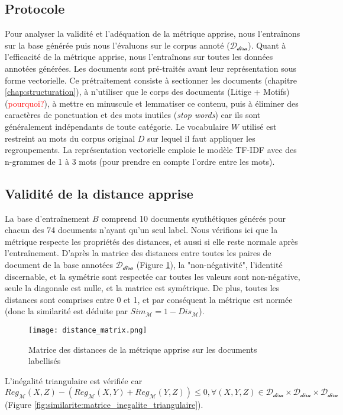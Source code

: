 \subsection{Protocole}
Pour analyser la validité et l'adéquation de la métrique apprise, nous l'entraînons sur la base générée puis nous l'évaluons sur le corpus annoté ($\mathcal{D_{\text{dira}}}$). Quant à l'efficacité de la métrique apprise, nous l'entraînons sur toutes les données annotées générées. Les documents sont pré-traités avant leur représentation sous forme vectorielle. Ce prétraitement consiste à sectionner les documents (chapitre \ref{chap:structuration}), à n'utiliser que le corps des documents (Litige + Motifs) (\textcolor{red}{pourquoi?}), à mettre en minuscule et lemmatiser ce contenu, puis à éliminer des caractères de ponctuation et des mots inutiles (\textit{stop words})  car ils sont généralement indépendants de toute catégorie. Le vocabulaire $W$ utilisé est restreint au mots du corpus original $D$ sur lequel il faut appliquer les regroupements. La représentation vectorielle emploie le modèle TF-IDF avec des n-grammes de 1 à 3 mots (pour prendre en compte l'ordre entre les mots).

\subsection{Validité de la distance apprise}
La base d'entraînement $B$ comprend 10 documents synthétiques générés pour chacun des 74 documents n'ayant qu'un seul label. Nous vérifions ici que la métrique respecte les propriétés des distances, et aussi si elle reste normale après l'entraînement. D'après la matrice des distances entre toutes les paires de document de la base annotées $\mathcal{D_{\text{dira}}}$ (Figure \ref{fig:similarite:distance_matrix}),  la "non-négativité", l'identité discernable, et la symétrie sont respectée car toutes les valeurs sont non-négative, seule la diagonale est nulle, et la matrice est symétrique. De plus, toutes les distances sont comprises entre 0 et 1, et par conséquent la métrique est normée (donc la similarité est déduite par $Sim_\mathcal{M} = 1 - Dis_\mathcal{M}$).

\begin{figure}[!htb]
	\centering \texttt{[image: distance\_matrix.png]}
	\caption{Matrice des distances de la métrique apprise sur les documents labellisés}\label{fig:similarite:distance_matrix}
\end{figure}

L'inégalité triangulaire est vérifiée car $Reg_\mathcal{M}(X,Z) - (Reg_\mathcal{M}(X,Y) + Reg_\mathcal{M}(Y,Z)) \leq 0, \forall (X,Y,Z) \in \mathcal{D_{\text{dira}}} \times \mathcal{D_{\text{dira}}} \times \mathcal{D_{\text{dira}}}$ (Figure \ref{fig:similarite:matrice_inegalite_triangulaire}).

